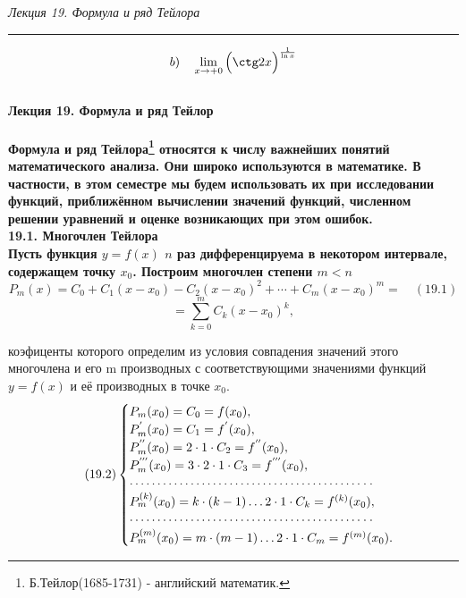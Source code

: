 \documentclass[12pt]{book}
\begin{document}
\small{ \slshape{      \hfill Лекция 19. Формула и ряд Тейлора} \upshape} \normalsize
\hrule\bigskip

 $$ b)\quad \lim_{x\to +0} \Big(\ctg2x \Big)^\frac{1}{\ln x}$$ \\
\bfseries  {Лекция 19. Формула и ряд Тейлор} \mdseries  \\

 \\


Формула и ряд Тейлора\footnote[9]{Б.Тейлор(1685-1731) - английский математик.} относятся к числу важнейших понятий математического анализа. Они широко используются в математике. В частности, в этом семестре мы будем использовать их при исследовании функций, приближённом вычислении значений функций, численном решении уравнений и оценке возникающих при этом ошибок.\\

\bfseries 19.1. Многочлен Тейлора \mdseries \\

Пусть функция $y = f(x)$ $n$ раз дифференцируема в некотором интервале, содержащем точку $x_{0}$. Построим многочлен степени $m<n$ \\
$$P_{m}(x)=C_{0}+C_{1}(x-x_{0})-C_{2}(x-x_{0})^2+ \cdots +C_{m}(x-x_{0})^m=\quad  (19.1) $$
$$=\sum\limits_{k=0}^{m} C_{k}(x-x_{0})^k,$$

\noindent коэфиценты которого определим из условия совпадения значений этого многочлена
 и его m производных с соответствующими значениями функций $y = f(x)$ и её
 производных в точке $x_{0}$.
\begin{equation} \tag{19.2}
\begin{cases} 
$$P_{m}(x_{0})=C_{0}=f(x_{0}),$$\\
$$P_{m}^{'}(x_{0})=C_{1}=f^{'}(x_{0}),$$\\
$$P_{m}^{''}(x_{0})=2 \cdot 1 \cdot C_{2}=f^{''}(x_{0}),$$\\
$$P_{m}^{'''}(x_{0})=3 \cdot 2 \cdot 1 \cdot C_{3}=f^{'''}(x_{0}),$$\\
$$\cdots\cdots\cdots\cdots\cdots\cdots\cdots\cdots\cdots\cdots\cdots\cdots\cdots\cdots\cdot\cdot $$\\   
$$P_{m}^{(k)}(x_{0})= k \cdot (k-1)\dots 2 \cdot 1 \cdot C_{k}=f^{(k)}(x_{0}),$$\\
$$\cdots\cdots\cdots\cdots\cdots\cdots\cdots\cdots\cdots\cdots\cdots\cdots\cdots\cdots\cdot\cdot$$\\
$$P_{m}^{(m)}(x_{0})= m \cdot (m-1)\dots 2 \cdot 1 \cdot C_{m}=f^{(m)}(x_{0}).$$\\
\end{cases}
\end{equation}
\end{document}
